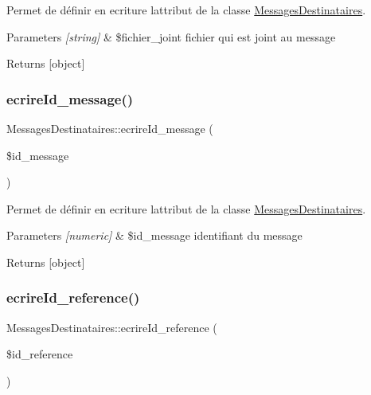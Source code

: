 Permet de définir en ecriture l\textquotesingle{}attribut de la classe \hyperlink{class_messages_destinataires}{Messages\+Destinataires}. 


\begin{DoxyParams}{Parameters}
{\em \mbox{[}string\mbox{]}} & \$fichier\+\_\+joint fichier qui est joint au message \\
\hline
\end{DoxyParams}
\begin{DoxyReturn}{Returns}
\mbox{[}object\mbox{]} 
\end{DoxyReturn}
\mbox{\label{class_messages_destinataires_aea5aed1c8ce67a439ae35c2bfa62e6d0}} 
\subsubsection{\texorpdfstring{ecrire\+Id\+\_\+message()}{ecrireId\_message()}}
{\footnotesize\ttfamily Messages\+Destinataires\+::ecrire\+Id\+\_\+message (\begin{DoxyParamCaption}\item[{}]{\$id\+\_\+message }\end{DoxyParamCaption})}



Permet de définir en ecriture l\textquotesingle{}attribut de la classe \hyperlink{class_messages_destinataires}{Messages\+Destinataires}. 


\begin{DoxyParams}{Parameters}
{\em \mbox{[}numeric\mbox{]}} & \$id\+\_\+message identifiant du message \\
\hline
\end{DoxyParams}
\begin{DoxyReturn}{Returns}
\mbox{[}object\mbox{]} 
\end{DoxyReturn}
\mbox{\label{class_messages_destinataires_a558514a13d24d12529fb44cb69570ebd}} 
\subsubsection{\texorpdfstring{ecrire\+Id\+\_\+reference()}{ecrireId\_reference()}}
{\footnotesize\ttfamily Messages\+Destinataires\+::ecrire\+Id\+\_\+reference (\begin{DoxyParamCaption}\item[{}]{\$id\+\_\+reference }\end{DoxyParamCaption})}



